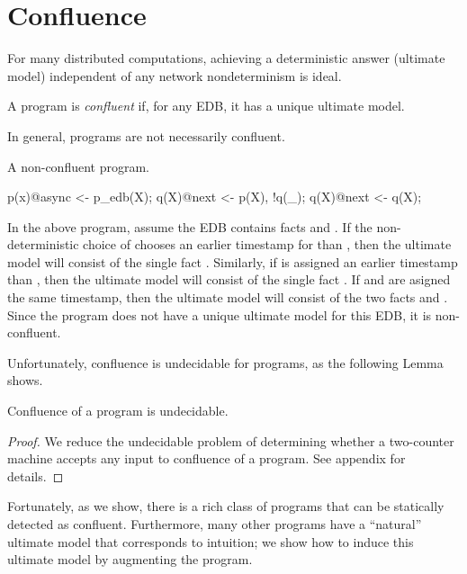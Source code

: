 \section{Confluence}

For many distributed computations, achieving a deterministic answer (ultimate model) independent of any network nondeterminism is ideal.

\begin{definition}
A \lang program is {\em confluent} if, for any EDB, it has a unique ultimate model.
\end{definition}

In general, \lang programs are not necessarily confluent.

\begin{example}
\label{ex:nonconfluent}
A non-confluent \lang program.

\begin{Dedalus}
p(x)@async <- p_edb(X);
q(X)@next <- p(X), !q(_);
q(X)@next <- q(X);
\end{Dedalus}
\end{example}

In the above program, assume the EDB contains facts  and .  If the non-deterministic choice of  chooses an earlier timestamp for  than , then the ultimate model will consist of the single fact .  Similarly, if  is assigned an earlier timestamp than , then the ultimate model will consist of the single fact .  If  and  are asigned the same timestamp, then the ultimate model will consist of the two facts  and .  Since the program does not have a unique ultimate model for this EDB, it is non-confluent.

Unfortunately, confluence is undecidable for \lang programs, as the following Lemma shows.

\begin{lemma}
\label{lem:confluence-undecidable}
Confluence of a \lang program is undecidable.
\end{lemma}
\begin{proof}
We reduce the undecidable problem of determining whether a two-counter machine accepts any input to confluence of a \lang program.  See appendix for details.
\end{proof}

Fortunately, as we show, there is a rich class of programs that can be statically detected as confluent.  Furthermore, many other programs have a ``natural'' ultimate model that corresponds to intuition; we show how to induce this ultimate model by augmenting the program.

